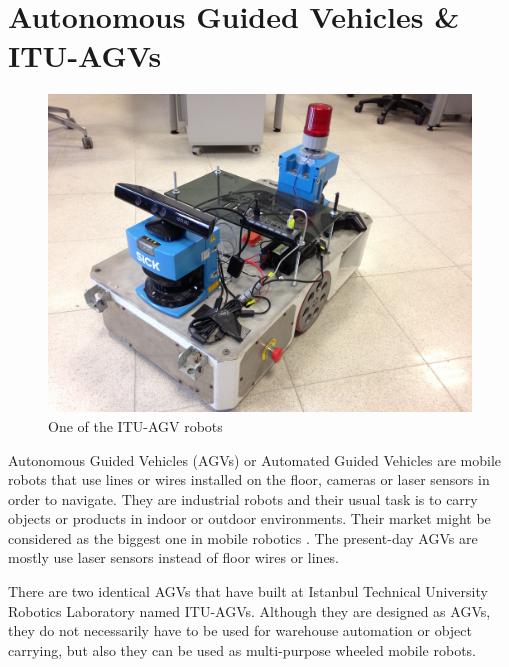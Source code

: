 
\chapter{Autonomous Guided Vehicles \& ITU-AGVs}
\label{chap:agvs}

\begin{figure}[h]
	\centering
	\includegraphics[scale=0.11]{images/agv1}
	\caption{One of the ITU-AGV robots}
	\label{fig:agv1}
\end{figure}

Autonomous Guided Vehicles (AGVs) or Automated Guided Vehicles are mobile robots that use lines or wires installed on the floor, cameras or laser sensors in order to navigate. They are industrial robots and their usual task is to carry objects or products in indoor or outdoor environments. Their market might be considered as the biggest one in mobile robotics \cite{alonzoKelly}. The present-day AGVs are mostly use laser sensors instead of floor wires or lines. 
\par
There are two identical AGVs that have built at Istanbul Technical University Robotics Laboratory named ITU-AGVs. Although they are designed as AGVs, they do not necessarily have to be used for warehouse automation or object carrying, but also they can be used as multi-purpose wheeled mobile robots. 

